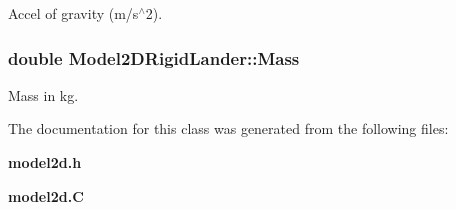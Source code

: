 Accel of gravity (m/s$^\wedge$2).

\subsubsection{\setlength{\rightskip}{0pt plus 5cm}double Model2DRigid\-Lander::Mass}\label{classModel2DRigidLander_m0}


Mass in kg.



The documentation for this class was generated from the following files:\begin{CompactItemize}
\item 
{\bf model2d.h}\item 
{\bf model2d.C}\end{CompactItemize}
